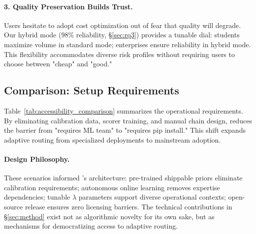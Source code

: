 \paragraph{3. Quality Preservation Builds Trust.}
Users hesitate to adopt cost optimization out of fear that quality will degrade. Our hybrid mode (98\% reliability, \S\ref{sec:rq3}) provides a tunable dial: students maximize volume in standard mode; enterprises ensure reliability in hybrid mode. This flexibility accommodates diverse risk profiles without requiring users to choose between "cheap" and "good."

\subsection{Comparison: Setup Requirements}

\begin{table}[t]
\centering
\small
\caption{\textbf{Accessibility Comparison.} We prioritize ease of deployment to expand the user base beyond ML experts.}
\label{tab:accessibility_comparison}
\end{table}

Table~\ref{tab:accessibility_comparison} summarizes the operational requirements. By eliminating calibration data, scorer training, and manual chain design, \ours{} reduces the barrier from "requires ML team" to "requires pip install." This shift expands adaptive routing from specialized deployments to mainstream adoption.

\paragraph{Design Philosophy.} These scenarios informed \ours{}'s architecture: pre-trained shippable priors eliminate calibration requirements; autonomous online learning removes expertise dependencies; tunable $\lambda$ parameters support diverse operational contexts; open-source release ensures zero licensing barriers. The technical contributions in \S\ref{sec:method} exist not as algorithmic novelty for its own sake, but as mechanisms for democratizing access to adaptive routing.

